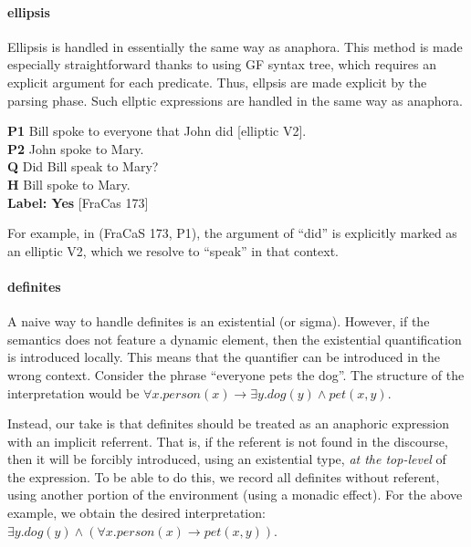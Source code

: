 \documentclass[11pt]{article}
\begin{document}
\paragraph{ellipsis} Ellipsis is handled in essentially the same way
as anaphora. This method is made especially straightforward thanks to
using GF syntax tree, which requires an explicit argument for each
predicate. Thus, ellpsis are made explicit by the parsing phase. Such
ellptic expressions are handled in the same way as anaphora.
\begin{lingex}
\item
    \label{ex:acd}
\textbf{P1}	Bill spoke to everyone that John did [elliptic V2].\\
\textbf{P2}	John spoke to Mary.\\
\textbf{Q} 	Did Bill speak to Mary?\\
\textbf{H} 	Bill spoke to Mary. \\ \textbf{Label:	Yes} [FraCas 173]
\end{lingex}
For example, in (FraCaS 173, P1), the argument of ``did'' is
explicitly marked as an elliptic V2, which we resolve to ``speak'' in
that context.
\paragraph{definites} A naive way to handle definites is an
existential (or sigma). However, if the semantics does not feature a
dynamic element, then the existential quantification is introduced
locally. This means that the quantifier can be introduced in the wrong
context. Consider the phrase ``everyone pets the dog''. The structure
of the interpretation would be
$∀x. person(x) → ∃y. dog(y) ∧ pet(x,y)$.

Instead, our take is that definites should be treated as an anaphoric
expression with an implicit referrent. That is, if the referent is not
found in the discourse, then it will be forcibly introduced, using an
existential type, \emph{at the top-level} of the expression. To be
able to do this, we record all definites without referent, using
another portion of the environment (using a monadic effect). For the
above example, we obtain the desired interpretation:
$∃y. dog(y) ∧ (∀x. person(x) → pet(x,y))$.
\end{document}
